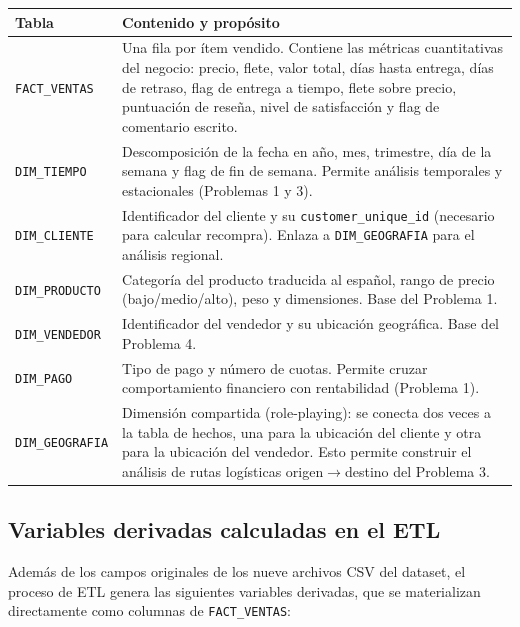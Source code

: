 \documentclass[11pt,a4paper]{article}
\begin{document}
\begin{tabularx}{\textwidth}{@{}L{3.2cm} X@{}}
\toprule
\textbf{Tabla} & \textbf{Contenido y propósito} \\
\midrule
\texttt{FACT\_VENTAS} & Una fila por ítem vendido. Contiene las métricas cuantitativas del negocio: precio, flete, valor total, días hasta entrega, días de retraso, flag de entrega a tiempo, flete sobre precio, puntuación de reseña, nivel de satisfacción y flag de comentario escrito. \\
\addlinespace
\texttt{DIM\_TIEMPO} & Descomposición de la fecha en año, mes, trimestre, día de la semana y flag de fin de semana. Permite análisis temporales y estacionales (Problemas 1 y 3). \\
\addlinespace
\texttt{DIM\_CLIENTE} & Identificador del cliente y su \texttt{customer\_unique\_id} (necesario para calcular recompra). Enlaza a \texttt{DIM\_GEOGRAFIA} para el análisis regional. \\
\addlinespace
\texttt{DIM\_PRODUCTO} & Categoría del producto traducida al español, rango de precio (bajo/medio/alto), peso y dimensiones. Base del Problema 1. \\
\addlinespace
\texttt{DIM\_VENDEDOR} & Identificador del vendedor y su ubicación geográfica. Base del Problema 4. \\
\addlinespace
\texttt{DIM\_PAGO} & Tipo de pago y número de cuotas. Permite cruzar comportamiento financiero con rentabilidad (Problema 1). \\
\addlinespace
\texttt{DIM\_GEOGRAFIA} & Dimensión compartida (role-playing): se conecta dos veces a la tabla de hechos, una para la ubicación del cliente y otra para la ubicación del vendedor. Esto permite construir el análisis de rutas logísticas origen$\to$destino del Problema 3. \\
\bottomrule
\end{tabularx}

\subsection{Variables derivadas calculadas en el ETL}

Además de los campos originales de los nueve archivos CSV del dataset, el proceso de ETL genera las siguientes variables derivadas, que se materializan directamente como columnas de \texttt{FACT\_VENTAS}:
\end{document}
